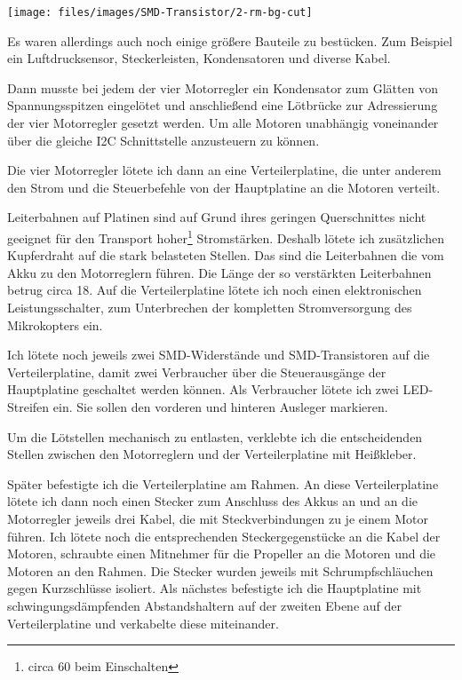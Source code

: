 \begin{figurewrapper}
	\texttt{[image: files/images/SMD-Transistor/2-rm-bg-cut]}\hspace{5cm}
	\label{fig:SMD-transistor}
\end{figurewrapper}

Es waren allerdings auch noch einige größere Bauteile zu bestücken.
Zum Beispiel ein Luftdrucksensor, Steckerleisten, Kondensatoren und diverse Kabel.

Dann musste bei jedem der vier Motorregler ein Kondensator
zum Glätten von Spannungsspitzen eingelötet
und anschließend eine Lötbrücke zur Adressierung der vier Motorregler gesetzt werden.
Um alle Motoren unabhängig voneinander über die gleiche \ac{I2C} Schnittstelle anzusteuern zu können.

Die vier Motorregler lötete ich dann an eine Verteilerplatine,
die unter anderem den Strom und die Steuerbefehle von der
Hauptplatine an die Motoren verteilt.

Leiterbahnen auf Platinen sind auf Grund ihres geringen Querschnittes
nicht geeignet für den Transport hoher\footnote{circa \unit{60}{\ampere} beim Einschalten}
Stromstärken.
Deshalb lötete ich zusätzlichen Kupferdraht auf die stark belasteten Stellen.
Das sind die Leiterbahnen die vom Akku zu den Motorreglern führen.
Die Länge der so verstärkten Leiterbahnen betrug circa \unit{18}{\centi\meter}.
Auf die Verteilerplatine lötete ich noch einen elektronischen Leistungsschalter,
zum Unterbrechen der kompletten Stromversorgung des Mikrokopters ein.

Ich lötete noch jeweils zwei \acs{SMD}-Widerstände
und \acs{SMD}-Transistoren auf die Verteilerplatine,
damit zwei Verbraucher über die Steuerausgänge der Hauptplatine geschaltet werden können.
Als Verbraucher lötete ich zwei \ac{LED}-Streifen ein.
Sie sollen den vorderen und hinteren Ausleger markieren.

Um die Lötstellen mechanisch zu entlasten,
verklebte ich die entscheidenden Stellen zwischen den Motorreglern
und der Verteilerplatine mit Heißkleber.

Später befestigte ich die Verteilerplatine am Rahmen.
An diese Verteilerplatine lötete ich dann noch einen Stecker zum Anschluss des Akkus an
und an die Motorregler jeweils drei Kabel, die mit Steckverbindungen zu je einem Motor führen.
Ich lötete noch die entsprechenden Steckergegenstücke an die Kabel der Motoren,
schraubte einen Mitnehmer für die Propeller an die Motoren und
die Motoren an den Rahmen.
Die Stecker wurden jeweils mit Schrumpfschläuchen gegen Kurzschlüsse isoliert.
Als nächstes befestigte ich die Hauptplatine mit schwingungsdämpfenden Abstandshaltern auf der
zweiten Ebene auf der Verteilerplatine und verkabelte diese miteinander.

